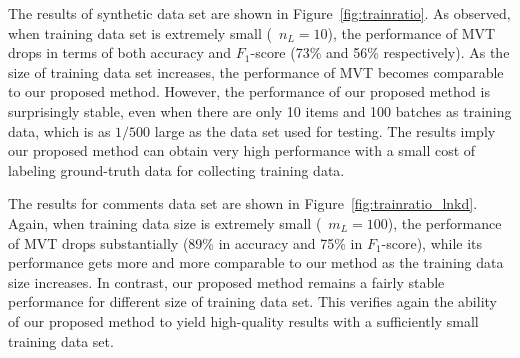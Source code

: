 The results of synthetic data set are shown in Figure~\ref{fig:trainratio}.  
As observed, when training data set is extremely small (\eg~$n_L=10$), 
the performance of MVT drops in terms of both accuracy and $F_1$-score (73\% and 56\% respectively).  
As the size of training data set increases, 
the performance of MVT becomes comparable to our proposed method.  
However, the performance of our proposed method is surprisingly stable, 
even when there are only 10 items and 100 batches as training data, 
which is as $1/500$ large as the data set used for testing.  
The results imply our proposed method can obtain very high performance 
with a small cost of labeling ground-truth data for collecting training data.  

The results for comments data set are shown in Figure~\ref{fig:trainratio_lnkd}.  
Again, when training data size is extremely small (\eg~$m_L=100$), 
the performance of MVT drops substantially (89\% in accuracy and 75\% in $F_1$-score), 
while its performance gets more and more comparable to our method as the training data size increases.  
In contrast, our proposed method remains a fairly stable performance for different size of training data set. 
This verifies again the ability of our proposed method to yield high-quality results 
with a sufficiently small training data set.  


%
